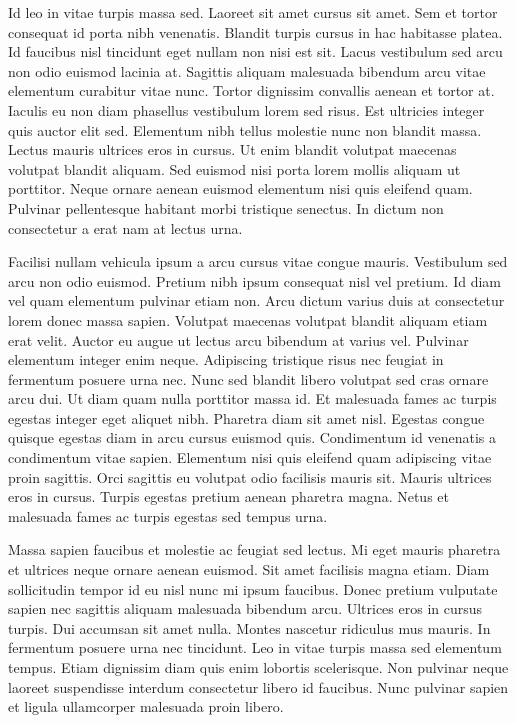 \documentclass[11pt,a4paper]{article}
\begin{document}
Id leo in vitae turpis massa sed. Laoreet sit amet cursus sit amet. Sem et tortor consequat id porta nibh venenatis. Blandit turpis cursus in hac habitasse platea. Id faucibus nisl tincidunt eget nullam non nisi est sit. Lacus vestibulum sed arcu non odio euismod lacinia at. Sagittis aliquam malesuada bibendum arcu vitae elementum curabitur vitae nunc. Tortor dignissim convallis aenean et tortor at. Iaculis eu non diam phasellus vestibulum lorem sed risus. Est ultricies integer quis auctor elit sed. Elementum nibh tellus molestie nunc non blandit massa. Lectus mauris ultrices eros in cursus. Ut enim blandit volutpat maecenas volutpat blandit aliquam. Sed euismod nisi porta lorem mollis aliquam ut porttitor. Neque ornare aenean euismod elementum nisi quis eleifend quam. Pulvinar pellentesque habitant morbi tristique senectus. In dictum non consectetur a erat nam at lectus urna.

Facilisi nullam vehicula ipsum a arcu cursus vitae congue mauris. Vestibulum sed arcu non odio euismod. Pretium nibh ipsum consequat nisl vel pretium. Id diam vel quam elementum pulvinar etiam non. Arcu dictum varius duis at consectetur lorem donec massa sapien. Volutpat maecenas volutpat blandit aliquam etiam erat velit. Auctor eu augue ut lectus arcu bibendum at varius vel. Pulvinar elementum integer enim neque. Adipiscing tristique risus nec feugiat in fermentum posuere urna nec. Nunc sed blandit libero volutpat sed cras ornare arcu dui. Ut diam quam nulla porttitor massa id. Et malesuada fames ac turpis egestas integer eget aliquet nibh. Pharetra diam sit amet nisl. Egestas congue quisque egestas diam in arcu cursus euismod quis. Condimentum id venenatis a condimentum vitae sapien. Elementum nisi quis eleifend quam adipiscing vitae proin sagittis. Orci sagittis eu volutpat odio facilisis mauris sit. Mauris ultrices eros in cursus. Turpis egestas pretium aenean pharetra magna. Netus et malesuada fames ac turpis egestas sed tempus urna.

Massa sapien faucibus et molestie ac feugiat sed lectus. Mi eget mauris pharetra et ultrices neque ornare aenean euismod. Sit amet facilisis magna etiam. Diam sollicitudin tempor id eu nisl nunc mi ipsum faucibus. Donec pretium vulputate sapien nec sagittis aliquam malesuada bibendum arcu. Ultrices eros in cursus turpis. Dui accumsan sit amet nulla. Montes nascetur ridiculus mus mauris. In fermentum posuere urna nec tincidunt. Leo in vitae turpis massa sed elementum tempus. Etiam dignissim diam quis enim lobortis scelerisque. Non pulvinar neque laoreet suspendisse interdum consectetur libero id faucibus. Nunc pulvinar sapien et ligula ullamcorper malesuada proin libero.
\end{document}

